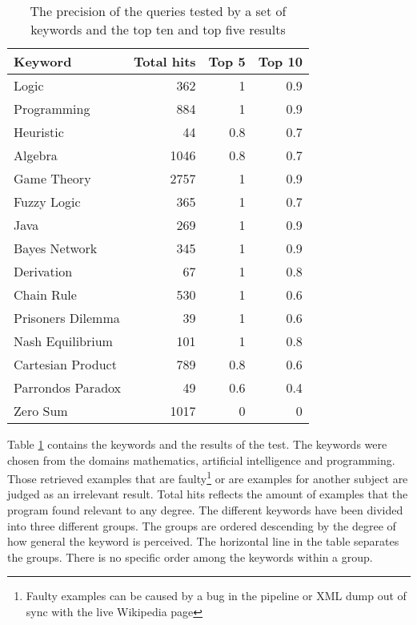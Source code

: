 

\begin{table}[h]
\centering
\small
\begin{tabular} {|| p{15em} | r | r | r ||} 
 \hline
 Keyword & Total hits & Top 5 & Top 10 \\ [0.5ex] 
 \hline

Logic & 362 & 1 & 0.9 \\
Programming & 884 & 1 & 0.9 \\
Heuristic & 44 & 0.8 & 0.7 \\
Algebra & 1046 & 0.8 & 0.7 \\
Game Theory & 2757 & 1 & 0.9 \\
\hline
Fuzzy Logic & 365 & 1 & 0.7 \\
Java & 269 & 1 & 0.9 \\
Bayes Network & 345 & 1 & 0.9 \\
Derivation & 67 & 1 & 0.8 \\
\hline
Chain Rule & 530 & 1 & 0.6 \\
Prisoners Dilemma & 39 & 1 & 0.6 \\
Nash Equilibrium & 101 & 1 & 0.8 \\
Cartesian Product & 789 & 0.8 & 0.6 \\
Parrondos Paradox & 49 & 0.6 & 0.4 \\
Zero Sum & 1017 & 0 & 0 \\

 \hline
\end{tabular}
\caption{The precision of the queries tested by a set of keywords and the top ten and top five results}
\label{table:precision_test}
\end{table}

Table \ref{table:precision_test} contains the keywords and the results of the test. The keywords were chosen from the domains mathematics, artificial intelligence and programming. Those retrieved examples that are faulty\footnote{Faulty examples can be caused by a bug in the pipeline or XML dump out of sync with the live Wikipedia page} or are examples for another subject are judged as an irrelevant result. Total hits reflects the amount of examples that the program found relevant to any degree. The different keywords have been divided into three different groups. The groups are ordered descending by the degree of how general the keyword is perceived. The horizontal line in the table separates the groups. There is no specific order among the keywords within a group.

